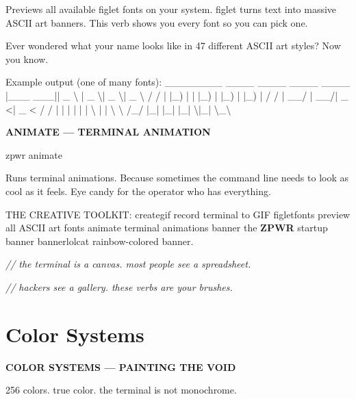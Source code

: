 \documentclass[11pt,a4paper,twoside]{book}
\begin{document}
Previews all available figlet fonts on your system. figlet turns text into massive ASCII art banners. This verb shows you every font so you can pick one.

Ever wondered what your name looks like in 47 different ASCII art styles? Now you know.

Example output (one of many fonts): \_\_\_\_\_\_\_\_  \_\_\_\_      \_\_\_\_  \_\_\_\_  \_\_\_\_ |\_\_\_  \_\_\_||  \_ \textbackslash{}    |  \_ \textbackslash{}|  \_ \textbackslash{}|  \_ \textbackslash{} / /    | |\_) |   | |\_) | |\_) | |\_) | / /     |  \_\_/    |  \_\_/|  \_ <|  \_ < / /      | |       | |   | | \textbackslash{} | | \textbackslash{} \textbackslash{} /\_/       |\_|       |\_|   |\_|  \textbackslash{}|\_|  \textbackslash{}\_\textbackslash{}


\vspace{12pt}
{\bfseries\color{neonyellow} ANIMATE — TERMINAL ANIMATION}\vspace{4pt}

\begin{codebox}
\color{neongreen}zpwr animate\\
\end{codebox}

Runs terminal animations. Because sometimes the command line needs to look as cool as it feels. Eye candy for the operator who has everything.

THE CREATIVE TOOLKIT: creategif       record terminal to GIF figletfonts     preview all ASCII art fonts animate         terminal animations banner          the \textbf{ZPWR} startup banner bannerlolcat    rainbow-colored banner.

{\small\itshape\color{dimtext} // the terminal is a canvas. most people see a spreadsheet.}

{\small\itshape\color{dimtext} // hackers see a gallery. these verbs are your brushes.}


\vspace{16pt}

\section{Color Systems}


\vspace{10pt}
{\large\bfseries\color{neoncyan} COLOR SYSTEMS — PAINTING THE VOID}\vspace{6pt}

256 colors. true color. the terminal is not monochrome.
\end{document}
